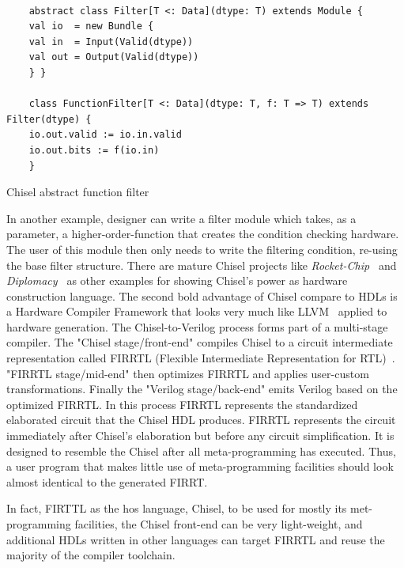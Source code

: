 \begin{listing}[ht]
    \begin{verbatim}

    abstract class Filter[T <: Data](dtype: T) extends Module {
    val io  = new Bundle {
    val in  = Input(Valid(dtype))
    val out = Output(Valid(dtype))
    } }

    class FunctionFilter[T <: Data](dtype: T, f: T => T) extends Filter(dtype) {
    io.out.valid := io.in.valid
    io.out.bits := f(io.in)
    }

    \end{verbatim}
    \caption{Chisel abstract function filter}
    \label{listing:chisel_example}
\end{listing}




In another example, designer can write a filter module which takes, as a parameter, a higher-order-function that creates the condition checking hardware.
The user of this module then only needs to write the filtering condition, re-using the base filter structure.
There are mature Chisel projects like \emph{Rocket-Chip~\cite{rocket-chip}} and \emph{Diplomacy~\cite{diplomacy}} as other examples for showing Chisel's power as hardware construction language.
The second bold advantage of Chisel compare to HDLs is a Hardware Compiler Framework that looks very much like LLVM~\cite{llvm} applied to hardware generation.
The Chisel-to-Verilog process forms part of a multi-stage compiler.
The "Chisel stage/front-end" compiles Chisel to a circuit intermediate representation called FIRRTL (Flexible Intermediate Representation for RTL)~\cite{firrtl}.
"FIRRTL stage/mid-end" then optimizes FIRRTL and applies user-custom transformations. Finally the "Verilog stage/back-end" emits Verilog based on the optimized FIRRTL.
In this process FIRRTL represents the standardized elaborated circuit that the Chisel HDL produces.
FIRRTL represents the circuit immediately after Chisel's elaboration but before any circuit simplification.
It is designed to resemble the Chisel after all meta-programming has executed. Thus, a user program that makes little use of meta-programming facilities should look almost identical to the generated FIRRT.

In fact, FIRTTL as the hos language, Chisel, to be used for mostly its met-programming facilities, the Chisel front-end can be very light-weight, and additional HDLs written in other languages can target FIRRTL and reuse the majority of the compiler toolchain.


